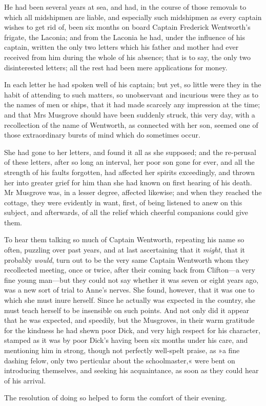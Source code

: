 He had been several years at sea, and had, in the course of those removals to which all midshipmen are liable, and especially such midshipmen as every captain wishes to get rid of, been six months on board Captain Frederick Wentworth's frigate, the Laconia; and from the Laconia he had, under the influence of his captain, written the only two letters which his father and mother had ever received from him during the whole of his absence; that is to say, the only two disinterested letters; all the rest had been mere applications for money.

In each letter he had spoken well of his captain; but yet, so little were they in the habit of attending to such matters, so unobservant and incurious were they as to the names of men or ships, that it had made scarcely any impression at the time; and that Mrs Musgrove should have been suddenly struck, this very day, with a recollection of the name of Wentworth, as connected with her son, seemed one of those extraordinary bursts of mind which do sometimes occur.

She had gone to her letters, and found it all as she supposed; and the re-perusal of these letters, after so long an interval, her poor son gone for ever, and all the strength of his faults forgotten, had affected her spirits exceedingly, and thrown her into greater grief for him than she had known on first hearing of his death. Mr Musgrove was, in a lesser degree, affected likewise; and when they reached the cottage, they were evidently in want, first, of being listened to anew on this subject, and afterwards, of all the relief which cheerful companions could give them.

To hear them talking so much of Captain Wentworth, repeating his name so often, puzzling over past years, and at last ascertaining that it \textit{might}, that it probably \textit{would}, turn out to be the very same Captain Wentworth whom they recollected meeting, once or twice, after their coming back from Clifton—a very fine young man—but they could not say whether it was seven or eight years ago, was a new sort of trial to Anne's nerves. She found, however, that it was one to which she must inure herself. Since he actually was expected in the country, she must teach herself to be insensible on such points. And not only did it appear that he was expected, and speedily, but the Musgroves, in their warm gratitude for the kindness he had shewn poor Dick, and very high respect for his character, stamped as it was by poor Dick's having been six months under his care, and mentioning him in strong, though not perfectly well-spelt praise, as »a fine dashing felow, only two perticular about the schoolmaster,« were bent on introducing themselves, and seeking his acquaintance, as soon as they could hear of his arrival.

The resolution of doing so helped to form the comfort of their evening.